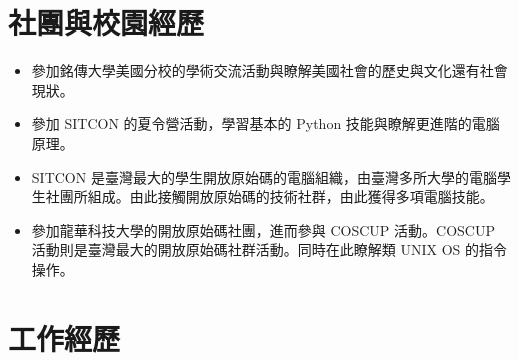 \documentclass{resume}
\begin{document}
\section{社團與校園經歷}
\begin{itemize}[parsep=0.5ex]
  \item 參加銘傳大學美國分校的學術交流活動與瞭解美國社會的歷史與文化還有社會現狀。
\end{itemize}

\begin{itemize}[parsep=0.5ex]
  \item 參加 SITCON 的夏令營活動，學習基本的 Python 技能與瞭解更進階的電腦原理。

  \item SITCON 是臺灣最大的學生開放原始碼的電腦組織，由臺灣多所大學的電腦學生社團所組成。由此接觸開放原始碼的技術社群，由此獲得多項電腦技能。
\end{itemize}

\begin{itemize}[parsep=0.5ex]
  \item	參加龍華科技大學的開放原始碼社團，進而參與 COSCUP 活動。COSCUP 活動則是臺灣最大的開放原始碼社群活動。同時在此瞭解類 UNIX OS 的指令操作。
\end{itemize}

\section{工作經歷}


\end{document}
